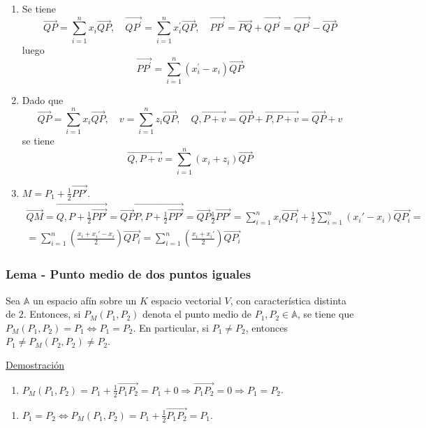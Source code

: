 \documentclass[12pt, a4paper, ones, notitlepage, openany,titlepage]{article}
\newcommand{\dobleimplicacion}[2]{
	\begin{enumerate}[label=$\Rightarrow/$]
		\item #1
	\end{enumerate}
	\begin{enumerate}[label=$\Leftarrow/$]
		\item #2
	\end{enumerate}
}
\newcommand{\demostracion}{\noindent\underline{Demostración}}
\begin{document}
\begin{enumerate}[label=(\arabic*)]
\item Se tiene
$$
\overrightarrow{Q P}=\sum_{i=1}^{n} x_{i} \overrightarrow{QP}, \quad \overrightarrow{Q P^{\prime}}=\sum_{i=1}^{n} x_{i}^{\prime} \overrightarrow{QP}, \quad \overrightarrow{P P^{\prime}}=\overrightarrow{P Q}+\overrightarrow{Q P^{\prime}}=\overrightarrow{Q P^{\prime}}-\overrightarrow{Q P}
$$
luego
$$
\overrightarrow{P P^{\prime}}=\sum_{i=1}^{n}\left(x_{i}^{\prime}-x_{i}\right) \overrightarrow{QP}
$$
\item Dado que
$$
\overrightarrow{Q P}=\sum_{i=1}^{n} x_{i} \overrightarrow{QP}, \quad v=\sum_{i=1}^{n} z_{i} \overrightarrow{QP}, \quad \overrightarrow{Q, P+v}=\overrightarrow{Q P}+\overrightarrow{P, P+v}=\overrightarrow{Q P}+v
$$
se tiene
$$
\overrightarrow{Q, P+v}=\sum_{i=1}^{n}\left(x_{i}+z_{i}\right) \overrightarrow{QP}
$$
\item $\displaystyle M = P_1 + \frac{1}{2}\overrightarrow{PP'}$.
\begin{gather*}
\overrightarrow{QM} = \overrightarrow{Q,P + \frac{1}{2}\overrightarrow{PP'}} = \overrightarrow{QP} \overrightarrow{P,P + \frac{1}{2}\overrightarrow{PP'}} = \overrightarrow{QP} \frac{1}{2}\overrightarrow{PP'} = \sum_{i=1}^{n} x_i \overrightarrow{QP_i} + \frac{1}{2} \sum_{i=1}^{n} (x_i' - x_i) \overrightarrow{QP_i} = \\
= \sum_{i=1}^{n} \left(\frac{x_i + x_i' - x_i}{2}\right) \overrightarrow{QP_i} = \sum_{i=1}^{n} \left(\frac{x_i + x_i'}{2}\right) \overrightarrow{QP_i}
\end{gather*}
\end{enumerate}

\subsubsection{Lema - Punto medio de dos puntos iguales}
Sea $\mathbb{A}$ un espacio afín sobre un $K$ espacio vectorial $V$, con característica distinta de $2$. Entonces, si $P_M(P_1,P_2)$ denota el punto medio de $P_1,P_2 \in \mathbb{A}$, se tiene que $P_M(P_1,P_2) = P_1 \Longleftrightarrow P_1 = P_2$. En particular, si $P_1 \neq P_2$, entonces $P_1 \neq P_M(P_2,P_2) \neq P_2$.

\demostracion
\dobleimplicacion{
	$\displaystyle P_M(P_1,P_2) = P_1 + \frac{1}{2} \overrightarrow{P_1 P_2} = P_1 + 0 \Longrightarrow \overrightarrow{P_1 P_2} = 0 \Longrightarrow P_1 = P_2$.
}{
	$\displaystyle P_1 = P_2 \Longleftrightarrow P_M(P_1,P_2) = P_1 + \frac{1}{2} \overrightarrow{P_1 P_2} = P_1$.
}
\end{document}
